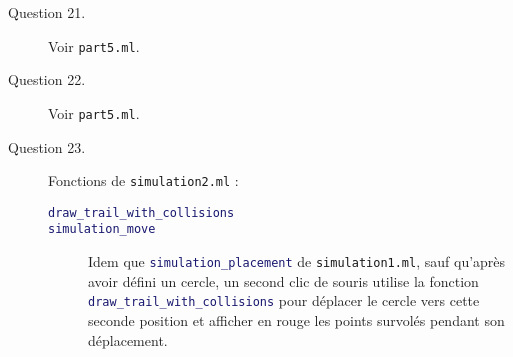 \documentclass[11pt]{scrartcl}
\newcommand{\functionname}[1]{\texttt{\textcolor{MidnightBlue}{#1}}}
\newcommand{\filename}[1]{\texttt{\textcolor{RawSienna}{#1}}}
\begin{document}
\begin{description}
\item[Question 21.] Voir \filename{part5.ml}.

\item[Question 22.] Voir \filename{part5.ml}.

\item[Question 23.] Fonctions de \filename{simulation2.ml} :
\begin{description}
\item[\functionname{draw_trail_with_collisions}]
\item[\functionname{simulation_move}] Idem que \functionname{simulation_placement} de \filename{simulation1.ml}, sauf qu'après avoir défini un cercle, un second clic de souris utilise la fonction \functionname{draw_trail_with_collisions} pour déplacer le cercle vers cette seconde position et afficher en rouge les points survolés pendant son déplacement.
\end{description}
\end{description}
\end{document}
